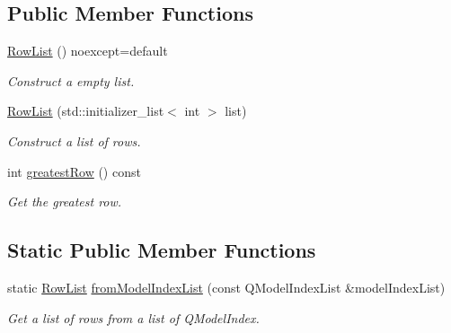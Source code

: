 \subsection*{Public Member Functions}
\begin{DoxyCompactItemize}
\item 
\hyperlink{class_mdt_1_1_item_model_1_1_row_list_ae7615db36b2dc16567a0f3013cd34035}{Row\+List} () noexcept=default\hypertarget{class_mdt_1_1_item_model_1_1_row_list_ae7615db36b2dc16567a0f3013cd34035}{}\label{class_mdt_1_1_item_model_1_1_row_list_ae7615db36b2dc16567a0f3013cd34035}

\begin{DoxyCompactList}\small\item\em Construct a empty list. \end{DoxyCompactList}\item 
\hyperlink{class_mdt_1_1_item_model_1_1_row_list_a802975a4285db79d5745fae814b1c3c6}{Row\+List} (std\+::initializer\+\_\+list$<$ int $>$ list)
\begin{DoxyCompactList}\small\item\em Construct a list of rows. \end{DoxyCompactList}\item 
int \hyperlink{class_mdt_1_1_item_model_1_1_row_list_a65e550ee78e70f792d87fb69076c4181}{greatest\+Row} () const 
\begin{DoxyCompactList}\small\item\em Get the greatest row. \end{DoxyCompactList}\end{DoxyCompactItemize}
\subsection*{Static Public Member Functions}
\begin{DoxyCompactItemize}
\item 
static \hyperlink{class_mdt_1_1_item_model_1_1_row_list}{Row\+List} \hyperlink{class_mdt_1_1_item_model_1_1_row_list_aa0f0c3fde6de5153c53c43d35034039d}{from\+Model\+Index\+List} (const Q\+Model\+Index\+List \&model\+Index\+List)\hypertarget{class_mdt_1_1_item_model_1_1_row_list_aa0f0c3fde6de5153c53c43d35034039d}{}\label{class_mdt_1_1_item_model_1_1_row_list_aa0f0c3fde6de5153c53c43d35034039d}

\begin{DoxyCompactList}\small\item\em Get a list of rows from a list of Q\+Model\+Index. \end{DoxyCompactList}\end{DoxyCompactItemize}
